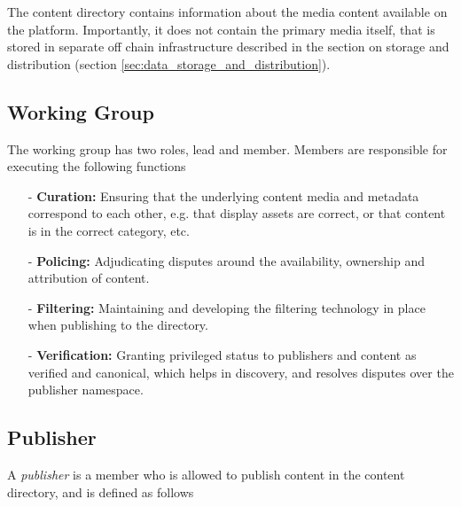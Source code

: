 \documentclass{article}
\begin{document}
The content directory contains information about the media content available on the platform. Importantly, it does not contain the primary media itself, that is stored in separate off chain infrastructure described in the section on storage and distribution (section \ref{sec:data_storage_and_distribution}).

\subsection{Working Group}

The working group has two roles, lead and member. Members are responsible for executing the following functions

\begin{itemize}

    \item[-] \textbf{Curation:} Ensuring that the underlying content media and metadata correspond to each other, e.g. that display assets are correct, or that content is in the correct category, etc.

    \item[-] \textbf{Policing:} Adjudicating disputes around the availability, ownership and attribution of content.

    \item[-] \textbf{Filtering:} Maintaining and developing the filtering technology in place when publishing to the directory.

    \item[-] \textbf{Verification:} Granting privileged status to publishers and content as verified and canonical, which helps in discovery, and resolves disputes over the publisher namespace.

\end{itemize}

\subsection{Publisher}

A \textit{publisher} is a member who is allowed to publish content in the content directory, and is defined as follows \\
\end{document}
